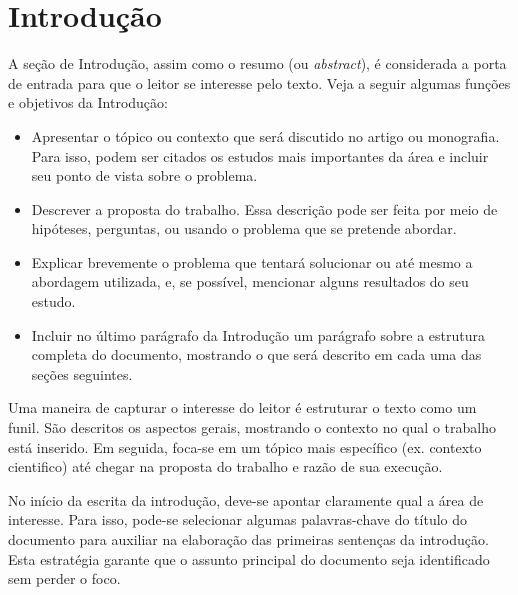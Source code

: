 \chapter{Introdução}
\label{ch:introducao}

A seção de Introdução, assim como o resumo (ou \textit{abstract}), é considerada a porta de entrada para que o leitor se interesse pelo texto. Veja a seguir algumas funções e objetivos da Introdução:

\begin{itemize}
    \item Apresentar o tópico ou contexto que será discutido no artigo ou monografia. Para isso, podem ser citados os estudos mais importantes da área e incluir seu ponto de vista sobre o problema.
    
    \item Descrever a proposta do trabalho. Essa descrição pode ser feita por meio de hipóteses, perguntas, ou usando o problema que se pretende abordar.
    
    \item Explicar brevemente o problema que tentará solucionar ou até mesmo a abordagem utilizada, e, se possível, mencionar alguns resultados do seu estudo.
    
    \item Incluir no último parágrafo da Introdução um parágrafo sobre a estrutura completa do documento, mostrando o que será descrito em cada uma das seções seguintes.
\end{itemize}

    Uma maneira de capturar o interesse do leitor é estruturar o texto como um funil. São descritos os aspectos gerais, mostrando o contexto no qual o trabalho está inserido. Em seguida, foca-se em um tópico mais específico (ex. contexto cientifico) até chegar na proposta do trabalho e razão de sua execução.

    No início da escrita da introdução, deve-se apontar claramente qual a área de interesse. Para isso, pode-se selecionar algumas palavras-chave do título do documento para auxiliar na elaboração das primeiras sentenças da introdução. Esta estratégia garante que o assunto principal do documento seja identificado sem perder o foco. 
    
